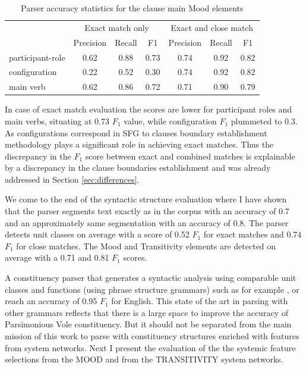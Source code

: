     \begin{table}[!ht]
    \centering
    \begin{tabular}{lcccccc}
    \toprule
     & \multicolumn{3}{c}{Exact match only} & \multicolumn{3}{c}{Exact and close match} \\ \cline{2-7} 
     & Precision & Recall & F1 & Precision & Recall & F1 \\ 
    \midrule
    participant-role &       0.62 &    0.88 & 0.73 &       0.74 &    0.92 & 0.82 \\
    configuration    &       0.22 &    0.52 & 0.30 &       0.74 &    0.92 & 0.82 \\
    main verb        &       0.62 &    0.86 & 0.72 &       0.71 &    0.90 & 0.79 \\ 
    \bottomrule
    \end{tabular}
    \caption{Parser accuracy statistics for the clause main Mood elements}
    \label{tab:unit-elements-transitivity-combined-F1}
    \end{table}
    
    In case of exact match evaluation the scores are lower for participant roles and main verbs, situating at 0.73 $F_1$ value, while configuration $F_1$ plummeted to 0.3. As configurations correspond in SFG to clauses boundary establishment methodology plays a significant role in achieving exact matches. Thus the discrepancy in the $F_1$ score between exact and combined matches is explainable by a discrepancy in the clause boundaries establishment and was already addressed in Section \ref{sec:differences}. 
    
    We come to the end of the syntactic structure evaluation where I have shown that the parser segments text exactly as in the corpus with an accuracy of 0.7 and an approximately same segmentation with an accuracy of 0.8. The parser detects unit classes on average with a score of 0.52 $F_1$ for exact matches and 0.74 $F_1$ for close matches. The Mood and Transitivity elements are detected on average with a 0.71 and 0.81 $F_1$ scores. 
    
    A constituency parser that generates a syntactic analysis using comparable unit classes and functions (using phrase structure grammars) such as for example \citet{chen2014fast}, \citet{stern2017minimal} or \citet{kitaev2018multilingual} reach an accuracy of 0.95 $F_1$ for English. This state of the art in parsing with other grammars reflects that there is a large space to improve the accuracy of Parsimonious Vole constituency. But it should not be separated from the main mission of this work to parse with constituency structures enriched with features from system networks. Next I present the evaluation of the the systemic feature selections from the MOOD and from the TRANSITIVITY system networks. 

